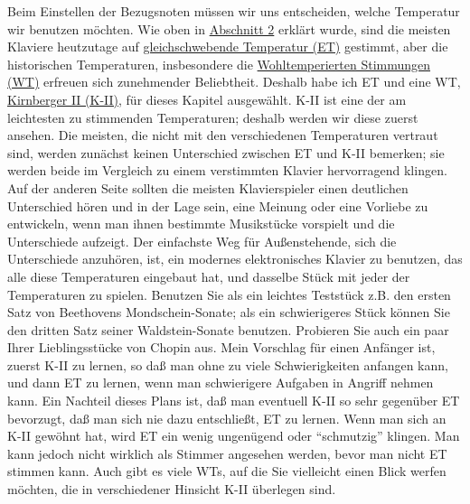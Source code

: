 Beim Einstellen der Bezugsnoten müssen wir uns entscheiden, welche Temperatur wir benutzen möchten.
 Wie oben in \hyperlink{c2_2}{Abschnitt 2} erklärt wurde, sind die meisten Klaviere heutzutage auf \hyperlink{et1}{gleichschwebende Temperatur (ET)} gestimmt, aber die historischen Temperaturen, insbesondere die \hyperlink{c2_2_wtk2}{Wohltemperierten Stimmungen (WT)} erfreuen sich zunehmender Beliebtheit.
 Deshalb habe ich ET und eine WT, \hyperlink{c2_6_kirn}{Kirnberger II (K-II)}, für dieses Kapitel ausgewählt.
 K-II ist eine der am leichtesten zu stimmenden Temperaturen; deshalb werden wir diese zuerst ansehen.
 Die meisten, die nicht mit den verschiedenen Temperaturen vertraut sind, werden zunächst keinen Unterschied zwischen ET und K-II bemerken; sie werden beide im Vergleich zu einem verstimmten Klavier hervorragend klingen.
 Auf der anderen Seite sollten die meisten Klavierspieler einen deutlichen Unterschied hören und in der Lage sein, eine Meinung oder eine Vorliebe zu entwickeln, wenn man ihnen bestimmte Musikstücke vorspielt und die Unterschiede aufzeigt.
 Der einfachste Weg für Außenstehende, sich die Unterschiede anzuhören, ist, ein modernes elektronisches Klavier zu benutzen, das alle diese Temperaturen eingebaut hat, und dasselbe Stück mit jeder der Temperaturen zu spielen.
 Benutzen Sie als ein leichtes Teststück z.B. den ersten Satz von Beethovens Mondschein-Sonate; als ein schwierigeres Stück können Sie den dritten Satz seiner Waldstein-Sonate benutzen.
 Probieren Sie auch ein paar Ihrer Lieblingsstücke von Chopin aus.
 Mein Vorschlag für einen Anfänger ist, zuerst K-II zu lernen, so daß man ohne zu viele Schwierigkeiten anfangen kann, und dann ET zu lernen, wenn man schwierigere Aufgaben in Angriff nehmen kann.
 Ein Nachteil dieses Plans ist, daß man eventuell K-II so sehr gegenüber ET bevorzugt, daß man sich nie dazu entschließt, ET zu lernen.
 Wenn man sich an K-II gewöhnt hat, wird ET ein wenig ungenügend oder \enquote{schmutzig} klingen.
 Man kann jedoch nicht wirklich als Stimmer angesehen werden, bevor man nicht ET stimmen kann.
 Auch gibt es viele WTs, auf die Sie vielleicht einen Blick werfen möchten, die in verschiedener Hinsicht K-II überlegen sind.
 

